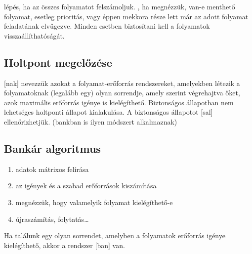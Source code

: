 \documentclass[../main.tex]{subfiles}
\begin{document}
 lépés, ha az összes folyamatot felszámoljuk.
, ha megnézzük, van-e menthető folyamat, esetleg
prioritás, vagy éppen mekkora része lett már az adott
folyamat feladatának elvűgezve. Minden esetben biztosítani
kell a folyamatok visszaállíthatóságát.

\subsection{Holtpont megelőzése}

[nak] nevezzük azokat a folyamat-erőforrás rendszereket,
amelyekben létezik a folyamatoknak (legalább egy) olyan sorrendje,
amely szerint végrehajtva őket, azok maximális erőforrás igénye is kielégíthető.
Biztonságos állapotban nem lehetséges holtponti állapot kialakulása.
A biztonságos állapotot [sal] ellenőrizhetjük.
(bankban is ilyen módszert alkalmaznak)

\subsection{Bankár algoritmus}

\begin{enumerate}
  \item adatok mátrixos felírása
  \item az igények és a szabad erőforrások kiszámítása
  \item megnézzük, hogy valamelyik folyamat kielégíthető-e
  \item újraszámítás, folytatás\dots
\end{enumerate}
Ha találunk egy olyan sorrendet,
amelyben a folyamatok erőforrás igénye kielégíthető,
akkor a rendszer [ban] van.
\end{document}
